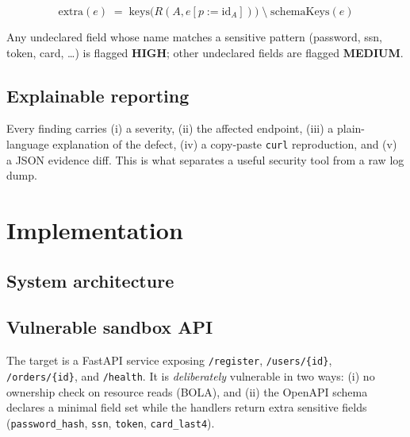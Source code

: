 \documentclass[11pt]{article}
\begin{document}
\[
\text{extra}(e) \;=\; \text{keys}\big(R(A, e[p{:=}\text{id}_A])\big)
                    \;\setminus\; \text{schemaKeys}(e)
\]

Any undeclared field whose name matches a sensitive pattern (password, ssn, token, card,
\ldots) is flagged \textbf{HIGH}; other undeclared fields are flagged \textbf{MEDIUM}.

\subsection{Explainable reporting}
Every finding carries (i) a severity, (ii) the affected endpoint, (iii) a plain-language
explanation of the defect, (iv) a copy-paste \texttt{curl} reproduction, and (v) a JSON
evidence diff. This is what separates a useful security tool from a raw log dump.

\section{Implementation}
\subsection{System architecture}
\begin{center}
\end{center}

\subsection{Vulnerable sandbox API}
The target is a FastAPI service exposing \texttt{/register}, \texttt{/users/\{id\}},
\texttt{/orders/\{id\}}, and \texttt{/health}. It is \emph{deliberately} vulnerable in two
ways: (i) no ownership check on resource reads (BOLA), and (ii) the OpenAPI schema declares
a minimal field set while the handlers return extra sensitive fields
(\texttt{password\_hash}, \texttt{ssn}, \texttt{token}, \texttt{card\_last4}).
\end{document}
